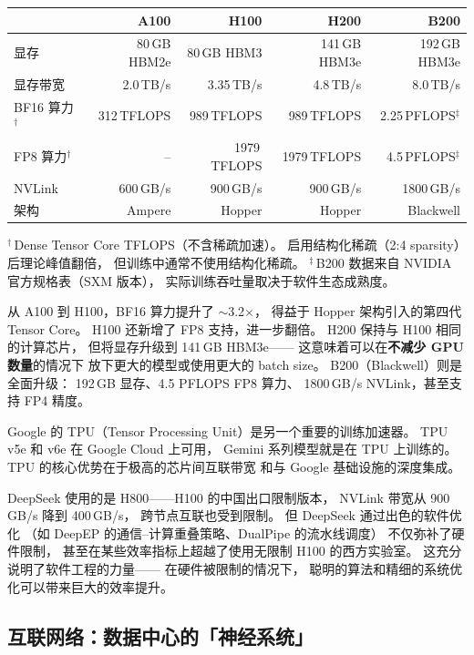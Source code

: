 \begin{center}
\begin{tabular}{lrrrr}
  \hline
  & \textbf{A100} & \textbf{H100} & \textbf{H200} & \textbf{B200} \\
  \hline
  显存 & 80\,GB HBM2e & 80\,GB HBM3 & 141\,GB HBM3e & 192\,GB HBM3e \\
  显存带宽 & 2.0\,TB/s & 3.35\,TB/s & 4.8\,TB/s & 8.0\,TB/s \\
  BF16 算力$^\dagger$ & 312\,TFLOPS & 989\,TFLOPS & 989\,TFLOPS & 2.25\,PFLOPS$^\ddagger$ \\
  FP8 算力$^\dagger$ & -- & 1979\,TFLOPS & 1979\,TFLOPS & 4.5\,PFLOPS$^\ddagger$ \\
  NVLink & 600\,GB/s & 900\,GB/s & 900\,GB/s & 1800\,GB/s \\
  架构 & Ampere & Hopper & Hopper & Blackwell \\
  \hline
\end{tabular}

\small
$^\dagger$\,Dense Tensor Core TFLOPS（不含稀疏加速）。
启用结构化稀疏（2:4 sparsity）后理论峰值翻倍，
但训练中通常不使用结构化稀疏。
$^\ddagger$\,B200 数据来自 NVIDIA 官方规格表（SXM 版本），
实际训练吞吐量取决于软件生态成熟度。
\end{center}

从 A100 到 H100，BF16 算力提升了 $\sim$3.2$\times$，
得益于 Hopper 架构引入的第四代 Tensor Core。
H100 还新增了 FP8 支持，进一步翻倍。
H200 保持与 H100 相同的计算芯片，
但将显存升级到 141\,GB HBM3e——
这意味着可以在\textbf{不减少 GPU 数量}的情况下
放下更大的模型或使用更大的 batch size。
B200（Blackwell）则是全面升级：
192\,GB 显存、4.5 PFLOPS FP8 算力、
1800\,GB/s NVLink，甚至支持 FP4 精度。

Google 的 TPU（Tensor Processing Unit）是另一个重要的训练加速器。
TPU v5e 和 v6e 在 Google Cloud 上可用，
Gemini 系列模型就是在 TPU 上训练的。
TPU 的核心优势在于极高的芯片间互联带宽
和与 Google 基础设施的深度集成。

DeepSeek 使用的是 H800——H100 的中国出口限制版本，
NVLink 带宽从 900\,GB/s 降到 400\,GB/s，
跨节点互联也受到限制。
但 DeepSeek 通过出色的软件优化
（如 DeepEP 的通信--计算重叠策略、DualPipe 的流水线调度）
不仅弥补了硬件限制，
甚至在某些效率指标上超越了使用无限制 H100 的西方实验室。
这充分说明了软件工程的力量——
在硬件被限制的情况下，
聪明的算法和精细的系统优化可以带来巨大的效率提升。

\subsection{互联网络：数据中心的「神经系统」}


